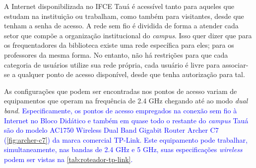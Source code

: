 \begin{figure}[H]
	\centering
\end{figure}

A Internet disponibilizada no IFCE Tauá é acessível tanto para aqueles que estudam na instituição ou trabalham, como também para visitantes, desde que tenham a senha de acesso. A rede sem fio é dividida de forma a atender cada setor que compõe a organização institucional do \textit{campus}. Isso quer dizer que para os frequentadores da biblioteca existe uma rede específica para eles; para os professores da mesma forma. No entanto, não há restrições para que cada categoria de usuários utilize sua rede própria, cada usuário é livre para associar-se a qualquer ponto de acesso disponível, desde que tenha autorização para tal.

As configurações que podem ser encontradas nos pontos de acesso variam de equipamentos que operam na frequência de 2.4 GHz chegando até ao modo \textit{dual band}. \textcolor{blue}{Especificamente, os pontos de acesso empregados na conexão sem fio à Internet no Bloco Didático e também em quase todo o restante do \textit{campus} Tauá são do modelo AC1750 Wireless Dual Band Gigabit Router Archer C7 (\autoref{fig:archer-c7}) da marca comercial TP-Link. Este equipamento pode trabalhar, simultaneamente, nas bandas de 2.4 GHz e 5 GHz, suas especificações \textit{wireless} podem ser vistas na \autoref{tab:roteador-tp-link}.}

